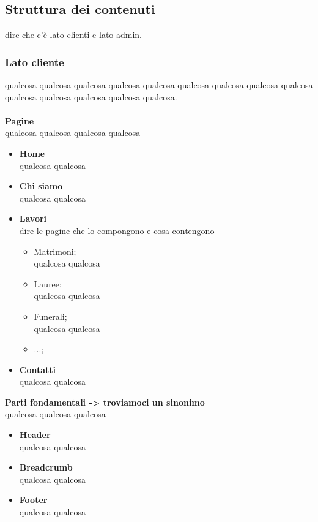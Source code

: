 \subsection{Struttura dei contenuti}
dire che c'è lato clienti e lato admin.

\subsubsection{Lato cliente}
qualcosa qualcosa qualcosa qualcosa qualcosa qualcosa qualcosa qualcosa qualcosa qualcosa qualcosa qualcosa qualcosa qualcosa.\\\\
\textbf{Pagine}\\
qualcosa qualcosa qualcosa qualcosa	
	\begin{itemize}
		\item \textbf{Home} \\qualcosa qualcosa
		\item \textbf{Chi siamo}\\qualcosa qualcosa
		\item \textbf{Lavori}\\dire le pagine che lo compongono e cosa contengono
	 	\begin{itemize}
 			\item Matrimoni;\\	qualcosa qualcosa 
	 		\item Lauree;\\	qualcosa qualcosa 
 			\item Funerali;\\	qualcosa qualcosa
 			\item ...; 		 		
	 	\end{itemize}
	 	\item \textbf{Contatti}\\qualcosa qualcosa\\
 	\end{itemize}
\textbf{Parti fondamentali -> troviamoci un sinonimo}\\ 
	qualcosa qualcosa qualcosa
	\begin{itemize}
		\item \textbf{Header}\\qualcosa qualcosa
		\item \textbf{Breadcrumb}\\qualcosa qualcosa
		\item \textbf{Footer}\\qualcosa qualcosa
 	\end{itemize}
 		
